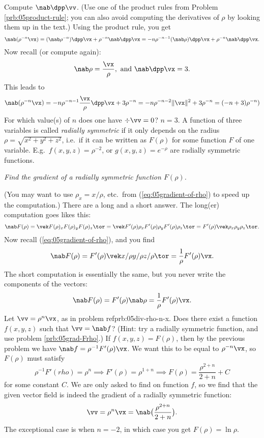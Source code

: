 \begin{multicols}{2}
\subprob Compute $\nab\dpp\vv$.   (Use one of the product 
rules from Problem \ref{prb:05product-rule}; you can also
avoid computing the derivatives of $\rho$ by looking them
 up in the text.)
\answer
Using the product rule, you get
\[
\nab(\rho^{-n}\vx)
= (\nab \rho^{-n})\dpp\vx + \rho^{-n}\nab\dpp\vx
= -n\rho^{-n-1}(\nab\rho)\dpp\vx + \rho^{-n}\nab\dpp\vx.
\]
Now recall (or compute again):
\[
\nab \rho = \frac{\vx} {\rho}, \text{ and }
\nab\dpp\vx = 3.
\]
This leads to
\[
\nab(\rho^{-n}\vx)
= - n \rho^{-n-1}\frac{\vx} {\rho}\dpp\vx + 3 \rho^{-n}
= - n \rho^{-n-2}\|\vx\|^2 + 3 \rho^{-n}
= (-n+3) \rho^{-n})
\]
\endanswer
\subprob For which value(s) of $n$ does one have $\div \vv = 0$? 
\answer
$n=3$.
\endanswer
\problem\label{prb:05grad-Frho} A function of three variables
is called \emph{radially symmetric}
if it only depends on the radius $\rho = \sqrt{x^2+y^2+z^2}$, i.e.\
if it can be written as $F(\rho)$ for some function $F$ of one variable.
E.g.\ $f(x, y, z) = \rho^{-2}$, or $g(x, y, z) = e^{-\rho}$ are radially
symmetric functions.  

\noindent%
\textit{Find the gradient of a radially symmetric function $F(\rho)$.}

(You may want to use $\rho_x = x/\rho$, etc.~from (\ref{eq:05gradient-of-rho})
to speed up the computation.)
\answer
There are a long and a short answer.  
The long(er) computation goes likes this:
\[
\nab F(\rho)
= \vek F(\rho)_x\\ F(\rho)_y \\ F(\rho)_z\tor
= \vek F'(\rho)\rho_x\\ F'(\rho)\rho_y \\ F'(\rho)\rho_z\tor
= F'(\rho)\vek \rho_x\\\rho_y\\\rho_z\tor.
\]
Now recall (\ref{eq:05gradient-of-rho}), and you find
\[
\nab F(\rho)
=F'(\rho)\vek x/\rho\\y/\rho\\z/\rho\tor
=\frac{1} {\rho}F'(\rho) \vx.
\]
The short computation is essentially the same, but you never
write the components of the vectors:
\[
\nab F(\rho) = F'(\rho) \nab \rho = \frac{1} {\rho}F'(\rho)\vx.
\]
\endanswer
\subprob Let $\vv = \rho^n\vx$, as in problem ref{prb:05div-rho-n-x}.  
Does there exist a function $f(x, y, z)$ such that $\vv = \nab f$?
(Hint: try a radially symmetric function, and use problem
\ref{prb:05grad-Frho}.)
\answer
If $f(x, y, z)= F(\rho)$, then by the previous problem
we have $\nab f = \rho^{-1}F'(\rho) \vx$.   We want this to be equal to
$\rho^{-n}\vx$, so $F(\rho)$ must satisfy
\[
\rho^{-1}F'(rho) = \rho^{n} \implies
F'(\rho) = \rho^{1+n} \implies
F(\rho) = \frac{\rho^{2+n}} {2+n} +C
\]
for some constant $C$.   We are only asked to find on function $f$,
so we find that the given vector field is indeed the gradient of a radially
symmetric function:
\[
\vv = \rho^{n}\vx = \nab \bigl(\frac{\rho^{2+n}} {2+n}\bigr).
\]
The exceptional case is when $n=-2$, in which case you get
$F(\rho) = \ln \rho$.
\endanswer

\end{multicols}
\noproblemfont


